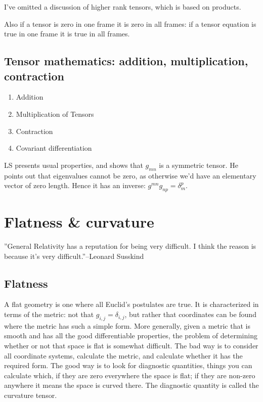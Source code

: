 \documentclass[]{article}
\begin{document}
I've omitted a discussion of higher rank tensors, which is based on products.

Also if a tensor is zero in one frame it is zero in all frames: if a tensor equation is true in one frame it is true in all frames.

\subsection{Tensor mathematics: addition, multiplication, contraction}

\begin{enumerate}
	\item Addition
	\item Multiplication of Tensors
	\item Contraction
	\item Covariant differentiation
\end{enumerate}

LS presents usual properties, and shows that $g_{mn}$ is a symmetric tensor. He points out that eigenvalues cannot be zero, as otherwise we'd have an elementary vector of zero length. Hence it has an inverse: $g^{mn}g_{np}=\delta_m^p$.


\section{Flatness \& curvature}

''General Relativity has a reputation for being very difficult. I think the reason is because it's very difficult.''--Leonard Susskind

\subsection{Flatness}

A flat geometry is one where all Euclid's postulates are true. It is characterized in terms of the metric: not that $g_{i,j} = \delta_{i,j}$, but rather that coordinates can be found where the metric has such a simple form. More generally, given a metric that is smooth and has all the good differentiable properties, the problem of determining whether or not that space is flat is somewhat difficult. The bad way is to consider all coordinate systems, calculate the metric, and calculate whether it has the required form. The good way is to look for diagnostic quantities, things you can calculate which, if they are zero everywhere the space is flat; if they are non-zero anywhere it means the space is curved there. The diagnostic quantity is called the curvature tensor.
\end{document}
